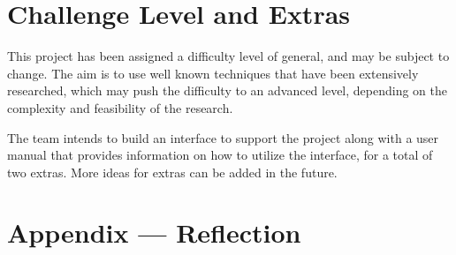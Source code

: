 \documentclass{article}
\begin{document}
\section{Challenge Level and Extras}
This project has been assigned a difficulty level of general, and may be subject
to change. The aim is to use well known techniques that have been extensively
researched, which may push the difficulty to an advanced level, depending on the
complexity and feasibility of the research. 


The team intends to build an interface to support the project along with a user
manual that provides information on how to utilize the interface, for a total of
two extras. More ideas for extras can be added in the future.



\newpage{}

\section*{Appendix --- Reflection}



\end{document}
